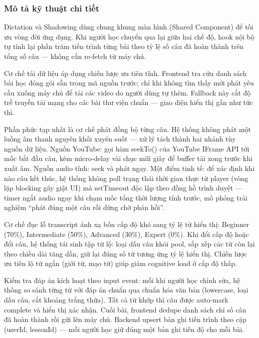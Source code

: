 \subsubsection{Mô tả kỹ thuật chi tiết}

Dictation và Shadowing dùng chung khung màn hình (Shared Component) để tối ưu vòng đời ứng dụng. Khi người học chuyển qua lại giữa hai chế độ, hook nội bộ tự tính lại phần trăm tiến trình từng bài theo tỷ lệ số câu đã hoàn thành trên tổng số câu --- không cần re-fetch từ máy chủ.

\begin{sloppypar}
Cơ chế tải dữ liệu áp dụng chiến lược ưu tiên tĩnh. Frontend tra cứu danh sách bài học đóng gói sẵn trong mã nguồn trước; chỉ khi không tìm thấy mới phát yêu cầu xuống máy chủ để tải các video do người dùng tự thêm. Fallback này cắt độ trễ truyền tải mạng cho các bài thư viện chuẩn --- giao diện hiển thị gần như tức thì.
\end{sloppypar}

\begin{sloppypar}
Phần phức tạp nhất là cơ chế phát đồng bộ từng câu. Hệ thống không phát một luồng âm thanh nguyên khối xuyên suốt --- xử lý tách thành hai nhánh tùy nguồn dữ liệu. Nguồn YouTube: gọi hàm seekTo() của YouTube IFrame API tới mốc bắt đầu câu, kèm micro-delay vài chục mili giây để buffer tải xong trước khi xuất âm. Nguồn audio tĩnh: seek và phát ngay. Một điểm tinh tế: để xác định khi nào câu kết thúc, hệ thống không poll trạng thái thời gian thực từ player (vòng lặp blocking gây giật UI) mà setTimeout độc lập theo đồng hồ trình duyệt --- timer ngắt audio ngay khi chạm mốc tổng thời lượng tính trước, mô phỏng trải nghiệm ``phát đúng một câu rồi dừng chờ phản hồi''.
\end{sloppypar}

\begin{sloppypar}
Cơ chế đục lỗ transcript ánh xạ bốn cấp độ khó sang tỷ lệ từ hiển thị: Beginner (70\%), Intermediate (50\%), Advanced (30\%), Expert (0\%). Khi đổi cấp độ hoặc đổi câu, hệ thống tái sinh tập từ lộ: loại dấu câu khỏi pool, sắp xếp các từ còn lại theo chiều dài tăng dần, giữ lại đúng số từ tương ứng tỷ lệ hiển thị. Chiến lược ưu tiên lộ từ ngắn (giới từ, mạo từ) giúp giảm cognitive load ở cấp độ thấp.
\end{sloppypar}

Kiểm tra đáp án kích hoạt theo input event: mỗi khi người học chỉnh sửa, hệ thống so sánh từng từ với đáp án chuẩn qua chuẩn hóa văn bản (lowercase, loại dấu câu, cắt khoảng trắng thừa). Tất cả từ khớp thì câu được auto-mark complete và hiển thị xác nhận. Cuối bài, frontend dedupe danh sách chỉ số câu đã hoàn thành rồi gửi lên máy chủ. Backend upsert bản ghi tiến trình theo cặp (userId, lessonId) --- mỗi người học giữ đúng một bản ghi tiến độ cho mỗi bài.


